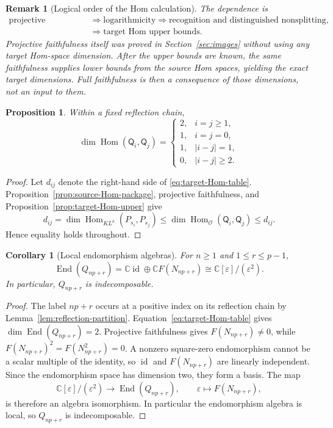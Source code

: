 \documentclass[12pt,leqno]{amsart}
\numberwithin{equation}{section}
\newtheorem{prop}[thm]{Proposition}
\newtheorem{cor}[thm]{Corollary}
\newtheorem{rmk}[thm]{Remark}
\newcommand{\End}{\operatorname{End}}
\newcommand{\Hom}{\operatorname{Hom}}
\newcommand{\id}{\operatorname{id}}
\newcommand{\KL}{KL}
\newcommand{\Oc}{\mathcal O}
\def\C{\mathbb{C}}
\begin{document}
\begin{rmk}[Logical order of the Hom calculation]\label{rmk:Hom-no-circularity}
The dependence is
\[
\begin{aligned}
 \text{projective faithfulness}
 &\Longrightarrow \text{logarithmicity}
 \Longrightarrow \text{recognition and distinguished nonsplitting},\\
 &\Longrightarrow \text{target Hom upper bounds}.
\end{aligned}
\]
Projective faithfulness itself was proved in Section~\ref{sec:images}
without using any target Hom-space dimension.  After the upper bounds are
known, the same faithfulness supplies lower bounds from the source Hom
spaces, yielding the exact target dimensions.  Full faithfulness is then a
consequence of those dimensions, not an input to them.
\end{rmk}

\begin{prop}\label{prop:target-Hom-table}
Within a fixed reflection chain,
\begin{equation}\label{eq:target-Hom-table}
 \dim\Hom(\mathsf Q_i,\mathsf Q_j)=
 \begin{cases}
  2,&i=j\geq1,\\
  1,&i=j=0,\\
  1,&|i-j|=1,\\
  0,&|i-j|\geq2.
 \end{cases}
\end{equation}
\end{prop}

\begin{proof}
Let $d_{ij}$ denote the right-hand side of
\eqref{eq:target-Hom-table}.  Proposition~\ref{prop:source-Hom-package},
projective faithfulness, and Proposition~\ref{prop:target-Hom-upper} give
\[
 d_{ij}
 =\dim\Hom_{\KL^k}(P_{s_i},P_{s_j})
 \le \dim\Hom_{\Oc}(\mathsf Q_i,\mathsf Q_j)
 \le d_{ij}.
\]
Hence equality holds throughout.
\end{proof}

\begin{cor}[Local endomorphism algebras]\label{cor:target-local-endomorphisms}
For $n\ge1$ and $1\le r\le p-1$,
\[
 \End(Q_{np+r})
 =\C\id\oplus\C F(N_{np+r})
 \cong\C[\varepsilon]/(\varepsilon^2).
\]
In particular, $Q_{np+r}$ is indecomposable.
\end{cor}

\begin{proof}
The label $np+r$ occurs at a positive index on its reflection chain by
Lemma~\ref{lem:reflection-partition}.  Equation~\eqref{eq:target-Hom-table}
gives $\dim\End(Q_{np+r})=2$.  Projective faithfulness gives
$F(N_{np+r})\neq0$, while
$F(N_{np+r})^2=F(N_{np+r}^2)=0$.  A nonzero square-zero
endomorphism cannot be a scalar multiple of the identity, so $\id$ and
$F(N_{np+r})$ are linearly independent.  Since the endomorphism space has
dimension two, they form a basis.  The map
\[
 \C[\varepsilon]/(\varepsilon^2)\longrightarrow\End(Q_{np+r}),
 \qquad \varepsilon\longmapsto F(N_{np+r}),
\]
is therefore an algebra isomorphism.  In particular the endomorphism
algebra is local, so $Q_{np+r}$ is indecomposable.
\end{proof}
\end{document}
